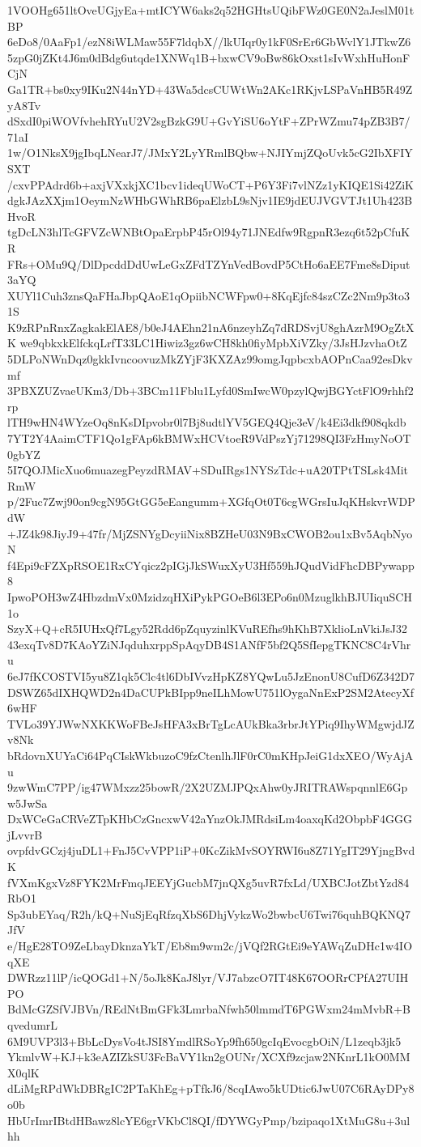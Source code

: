 1VOOHg651ltOveUGjyEa+mtICYW6aks2q52HGHtsUQibFWz0GE0N2aJeslM01tBP
6eDo8/0AaFp1/ezN8iWLMaw55F7ldqbX//lkUIqr0y1kF0SrEr6GbWvlY1JTkwZ6
5zpG0jZKt4J6m0dBdg6utqde1XNWq1B+bxwCV9oBw86kOxst1sIvWxhHuHonFCjN
Ga1TR+bs0xy9IKu2N44nYD+43Wa5dcsCUWtWn2AKc1RKjvLSPaVnHB5R49ZyA8Tv
dSxdI0piWOVfvhehRYuU2V2sgBzkG9U+GvYiSU6oYtF+ZPrWZmu74pZB3B7/71aI
1w/O1NksX9jgIbqLNearJ7/JMxY2LyYRmlBQbw+NJIYmjZQoUvk5cG2IbXFIYSXT
/cxvPPAdrd6b+axjVXxkjXC1bcv1ideqUWoCT+P6Y3Fi7vlNZz1yKIQE1Si42ZiK
dgkJAzXXjm1OeymNzWHbGWhRB6paElzbL9sNjv1IE9jdEUJVGVTJt1Uh423BHvoR
tgDcLN3hlTcGFVZcWNBtOpaErpbP45rOl94y71JNEdfw9RgpnR3ezq6t52pCfuKR
FRs+OMu9Q/DlDpcddDdUwLeGxZFdTZYnVedBovdP5CtHo6aEE7Fme8sDiput3aYQ
XUYl1Cuh3znsQaFHaJbpQAoE1qOpiibNCWFpw0+8KqEjfc84szCZc2Nm9p3to31S
K9zRPnRnxZagkakElAE8/b0eJ4AEhn21nA6nzeyhZq7dRDSvjU8ghAzrM9OgZtXK
we9qbkxkElfckqLrfT33LC1Hiwiz3gz6wCH8kh0fiyMpbXiVZky/3JsHJzvhaOtZ
5DLPoNWnDqz0gkkIvncoovuzMkZYjF3KXZAz99omgJqpbcxbAOPnCaa92esDkvmf
3PBXZUZvaeUKm3/Db+3BCm11Fblu1Lyfd0SmIwcW0pzylQwjBGYctFlO9rhhf2rp
lTH9wHN4WYzeOq8nKsDIpvobr0l7Bj8udtlYV5GEQ4Qje3eV/k4Ei3dkf908qkdb
7YT2Y4AaimCTF1Qo1gFAp6kBMWxHCVtoeR9VdPszYj71298QI3FzHmyNoOT0gbYZ
5I7QOJMicXuo6muazegPeyzdRMAV+SDuIRgs1NYSzTdc+uA20TPtTSLsk4MitRmW
p/2Fuc7Zwj90on9cgN95GtGG5eEangumm+XGfqOt0T6cgWGrsIuJqKHskvrWDPdW
+JZ4k98JiyJ9+47fr/MjZSNYgDcyiiNix8BZHeU03N9BxCWOB2ou1xBv5AqbNyoN
f4Epi9cFZXpRSOE1RxCYqicz2pIGjJkSWuxXyU3Hf559hJQudVidFhcDBPywapp8
IpwoPOH3wZ4HbzdmVx0MzidzqHXiPykPGOeB6l3EPo6n0MzuglkhBJUIiquSCH1o
SzyX+Q+cR5IUHxQf7Lgy52Rdd6pZquyzinlKVuREfhs9hKhB7XklioLnVkiJsJ32
43exqTv8D7KAoYZiNJqduhxrppSpAqyDB4S1ANfF5bf2Q5SfIepgTKNC8C4rVhru
6eJ7fKCOSTVI5yu8Z1qk5Clc4tl6DbIVvzHpKZ8YQwLu5JzEnonU8CufD6Z342D7
DSWZ65dIXHQWD2n4DaCUPkBIpp9neILhMowU751lOygaNnExP2SM2AtecyXf6wHF
TVLo39YJWwNXKKWoFBeJsHFA3xBrTgLcAUkBka3rbrJtYPiq9IhyWMgwjdJZv8Nk
bRdovnXUYaCi64PqCIskWkbuzoC9fzCtenlhJlF0rC0mKHpJeiG1dxXEO/WyAjAu
9zwWmC7PP/ig47WMxzz25bowR/2X2UZMJPQxAhw0yJRITRAWspqnnlE6Gpw5JwSa
DxWCeGaCRVeZTpKHbCzGncxwV42aYnzOkJMRdsiLm4oaxqKd2ObpbF4GGGjLvvrB
ovpfdvGCzj4juDL1+FnJ5CvVPP1iP+0KcZikMvSOYRWI6u8Z71YgIT29YjngBvdK
fVXmKgxVz8FYK2MrFmqJEEYjGucbM7jnQXg5uvR7fxLd/UXBCJotZbtYzd84RbO1
Sp3ubEYaq/R2h/kQ+NuSjEqRfzqXbS6DhjVykzWo2bwbcU6Twi76quhBQKNQ7JfV
e/HgE28TO9ZeLbayDknzaYkT/Eb8m9wm2c/jVQf2RGtEi9eYAWqZuDHc1w4IOqXE
DWRzz11lP/icQOGd1+N/5oJk8KaJ8lyr/VJ7abzcO7IT48K67OORrCPfA27UIHPO
BdMcGZSfVJBVn/REdNtBmGFk3LmrbaNfwh50lmmdT6PGWxm24mMvbR+BqvedumrL
6M9UVP3l3+BbLcDysVo4tJSI8YmdlRSoYp9fh650gcIqEvocgbOiN/L1zeqb3jk5
YkmlvW+KJ+k3eAZIZkSU3FcBaVY1kn2gOUNr/XCXf9zcjaw2NKnrL1kO0MMX0qlK
dLiMgRPdWkDBRgIC2PTaKhEg+pTfkJ6/8cqIAwo5kUDtic6JwU07C6RAyDPy8o0b
HbUrImrIBtdHBawz8lcYE6grVKbCl8QI/fDYWGyPmp/bzipaqo1XtMuG8u+3ulhh
